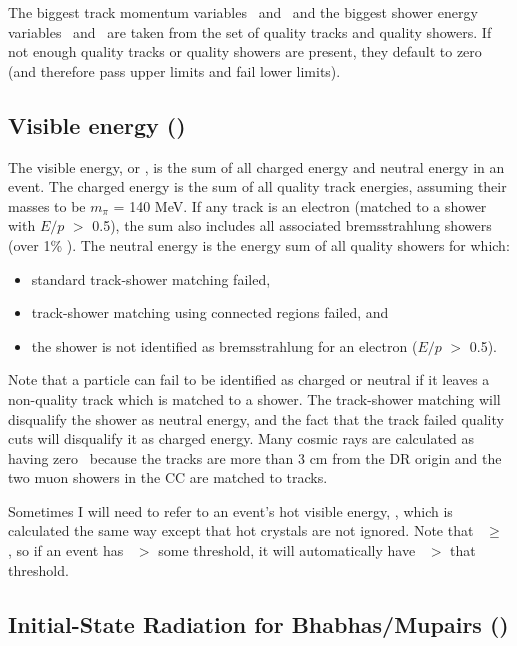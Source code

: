 The biggest track momentum variables \pone\ and \ptwo\ and the biggest
shower energy variables \eone\ and \etwo\ are taken from the set of
quality tracks and quality showers.  If not enough quality tracks or
quality showers are present, they default to zero (and therefore pass
upper limits and fail lower limits).

\subsection{Visible energy (\visen)}

The visible energy, or \visen, is the sum of all charged energy and
neutral energy in an event.  The charged energy is the sum of all
quality track energies, assuming their masses to be $m_\pi$ = 140 MeV.
If any track is an electron (matched to a shower with $E/p$ $>$ 0.5),
the sum also includes all associated bremsstrahlung showers (over 1\%
\ebeam).  The neutral energy is the energy sum of all quality showers
for which:
\begin{itemize}
  \item standard track-shower matching failed,

  \item track-shower matching using connected regions failed, and

  \item the shower is not identified as bremsstrahlung for an electron
    ($E/p$ $>$ 0.5).
\end{itemize}

Note that a particle can fail to be identified as charged or neutral
if it leaves a non-quality track which is matched to a shower.  The
track-shower matching will disqualify the shower as neutral energy,
and the fact that the track failed quality cuts will disqualify it as
charged energy.  Many cosmic rays are calculated as having zero
\visen\ because the tracks are more than 3 cm from the DR origin and
the two muon showers in the CC are matched to tracks.

Sometimes I will need to refer to an event's hot visible energy,
\hotvisen, which is calculated the same way except that hot crystals
are not ignored.  Note that \hotvisen\ $\ge$ \visen, so if an event
has \visen\ $>$ some threshold, it will automatically have \hotvisen\
$>$ that threshold.

\subsection{Initial-State Radiation for Bhabhas/Mupairs (\eisr)}

